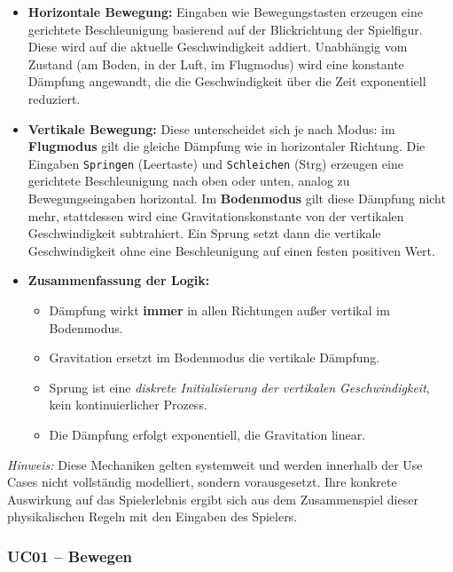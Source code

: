 \documentclass{article}
\begin{document}
\begin{itemize}
  \item \textbf{Horizontale Bewegung:}  Eingaben wie Bewegungstasten erzeugen eine gerichtete Beschleunigung basierend auf der Blickrichtung der Spielfigur. Diese wird auf die aktuelle Geschwindigkeit addiert. Unabhängig vom Zustand (am Boden, in der Luft, im Flugmodus) wird eine konstante Dämpfung angewandt, die die Geschwindigkeit über die Zeit exponentiell reduziert.

  \item \textbf{Vertikale Bewegung:}  Diese unterscheidet sich je nach Modus: im \textbf{Flugmodus} gilt die gleiche Dämpfung wie in horizontaler Richtung. Die Eingaben \texttt{Springen} (Leertaste) und \texttt{Schleichen} (Strg) erzeugen eine gerichtete Beschleunigung nach oben oder unten, analog zu Bewegungseingaben horizontal. Im \textbf{Bodenmodus} gilt diese Dämpfung nicht mehr, stattdessen wird eine Gravitationskonstante von der vertikalen Geschwindigkeit subtrahiert. Ein Sprung setzt dann die vertikale Geschwindigkeit ohne eine Beschleunigung auf einen festen positiven Wert.

  \item \textbf{Zusammenfassung der Logik:}
  \begin{itemize}
    \item Dämpfung wirkt \textbf{immer} in allen Richtungen au\ss{}er vertikal im Bodenmodus.
    \item Gravitation ersetzt im Bodenmodus die vertikale Dämpfung.
    \item Sprung ist eine \textit{diskrete Initialisierung der vertikalen Geschwindigkeit}, kein kontinuierlicher Prozess.
    \item Die Dämpfung erfolgt exponentiell, die Gravitation linear.
  \end{itemize}
\end{itemize}

\textit{Hinweis:} Diese Mechaniken gelten systemweit und werden innerhalb der Use Cases nicht vollständig modelliert, sondern vorausgesetzt. Ihre konkrete Auswirkung auf das Spielerlebnis ergibt sich aus dem Zusammenspiel dieser physikalischen Regeln mit den Eingaben des Spielers.

\newpage

\subsubsection*{UC01 – Bewegen}
\end{document}
